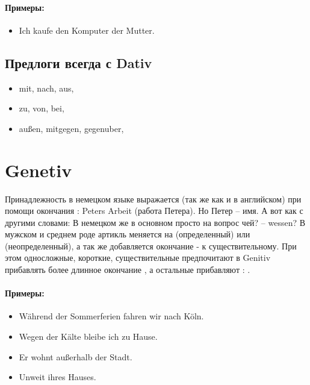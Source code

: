 \paragraph{Примеры:}

\begin{itemize}
\item Ich kaufe den Komputer der Mutter.
~\\ 
\end{itemize}

\subsection{Предлоги всегда с Dativ}

\begin{itemize}
\item mit, nach, aus,
\item zu, von, bei,
\item außen, mitgegen, gegenuber,
\end{itemize}

\section{Genetiv}

Принадлежность в немецком языке выражается (так же как и в английском) при помощи окончания : Peters Arbeit (работа Петера). Но Петер – имя. А вот как с другими словами: В немецком же в основном просто на вопрос чей? – wessen?
В мужском и среднем роде артикль меняется на  (определенный) или  (неопределенный), а так же добавляется окончание -  к существительному. При этом односложные, короткие, существительные предпочитают в Genitiv прибавлять более длинное окончание , а остальные прибавляют : .

\paragraph{Примеры:}

\begin{itemize}
\item Während der Sommerferien fahren wir nach Köln.
~\\ 
\item Wegen der Kälte bleibe ich zu Hause.
~\\ 
\item Er wohnt außerhalb der Stadt.
~\\ 
\item Unweit ihres Hauses.
~\\ 
\end{itemize}

